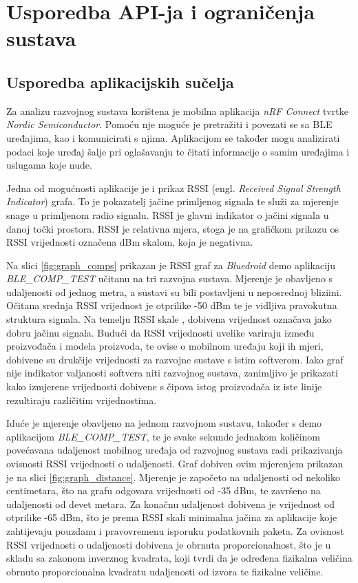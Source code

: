 \chapter{Usporedba API-ja i ograničenja sustava}

\section{Usporedba aplikacijskih sučelja}

Za analizu razvojnog sustava korištena je mobilna aplikacija \textit{nRF Connect} tvrtke \textit{Nordic Semiconductor}. Pomoću nje moguće je pretražiti i povezati se sa BLE uređajima, kao i komunicirati s njima. Aplikacijom se također mogu analizirati podaci koje uređaj šalje pri oglašavanju te čitati informacije o samim uređajima i uslugama koje nude. \cite{nrfapp}

Jedna od mogućnosti aplikacije je i prikaz RSSI (engl. \textit{Received Signal Strength Indicator}) grafa. To je pokazatelj jačine primljenog signala te služi za mjerenje snage u primljenom radio signalu. RSSI je glavni indikator o jačini signala u danoj točki prostora. RSSI je relativna mjera, stoga je na grafičkom prikazu os RSSI vrijednosti označena dBm skalom, koja je negativna. 

Na slici \ref{fig:graph_comps} prikazan je RSSI graf za \textit{Bluedroid} demo aplikaciju \textit{BLE\_COMP\_TEST} učitanu na tri razvojna sustava. Mjerenje je obavljeno s udaljenosti od jednog metra, a sustavi su bili postavljeni u neposrednoj bliziini. Očitana srednja RSSI vrijednost je otprilike -50 dBm te je vidljiva pravokutna struktura signala. Na temelju RSSI skale \cite{rssi}, dobivena vrijednost označava jako dobru jačinu signala. Budući da RSSI vrijednosti uvelike variraju između proizvođača i modela proizvoda, te ovise o mobilnom uređaju koji ih mjeri, dobivene su drukčije vrijednosti za razvojne sustave s istim softverom. Iako graf nije indikator valjanosti softvera niti razvojnog sustava, zanimljivo je prikazati kako izmjerene vrijednosti dobivene s čipova istog proizvođača iz iste linije rezultiraju različitim vrijednostima.

Iduće je mjerenje obavljeno na jednom razvojnom sustavu, također s demo aplikacijom \textit{BLE\_COMP\_TEST}, te je svake sekunde jednakom količinom povećavana udaljenost mobilnog uređaja od razvojnog sustava radi prikazivanja ovisnosti RSSI vrijednosti o udaljenosti. Graf dobiven ovim mjerenjem prikazan je na slici \ref{fig:graph_distance}. Mjerenje je započeto na udaljenosti od nekoliko centimetara, što na grafu odgovara vrijednosti od -35 dBm, te završeno na udaljenosti od devet metara. Za konačnu udaljenost dobivena je vrijednost od otprilike -65 dBm, što je prema RSSI skali \cite{rssi} minimalna jačina za aplikacije koje zahtijevaju pouzdanu i pravovremenu isporuku podatkovnih paketa. Za ovisnost RSSI vrijednosti o udaljenosti dobivena je obrnuta proporcionalnost, što je u skladu sa zakonom inverznog kvadrata, koji tvrdi da je određena fizikalna veličina obrnuto proporcionalna kvadratu udaljenosti od izvora te fizikalne veličine.


